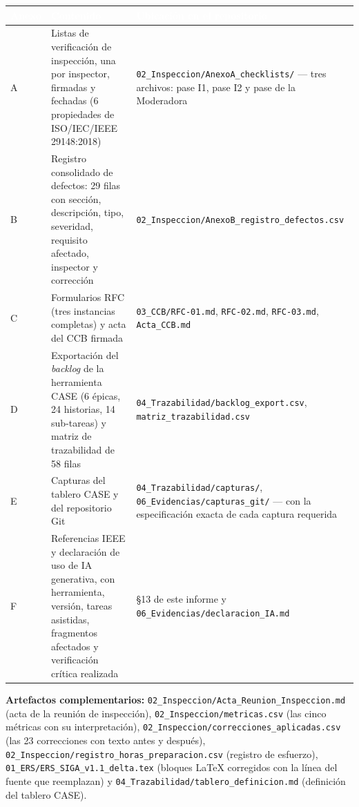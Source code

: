 \documentclass[11pt,letterpaper]{article}
\newcommand{\thead}[1]{\cellcolor{uteqverde}\textcolor{white}{\textbf{#1}}}
\begin{document}
\begin{center}
\small
\begin{tabular}{|p{1.3cm}|p{5.6cm}|p{7.6cm}|}
\hline
\thead{Anexo} & \thead{Contenido} & \thead{Ubicación en el repositorio} \\ \hline
A & Listas de verificación de inspección, una por inspector, firmadas y fechadas (6 propiedades de ISO/IEC/IEEE 29148:2018) & \texttt{02\_Inspeccion/AnexoA\_checklists/} --- tres archivos: pase I1, pase I2 y pase de la Moderadora \\ \hline
B & Registro consolidado de defectos: 29 filas con sección, descripción, tipo, severidad, requisito afectado, inspector y corrección & \texttt{02\_Inspeccion/AnexoB\_registro\_defectos.csv} \\ \hline
C & Formularios RFC (tres instancias completas) y acta del CCB firmada & \texttt{03\_CCB/RFC-01.md}, \texttt{RFC-02.md}, \texttt{RFC-03.md}, \texttt{Acta\_CCB.md} \\ \hline
D & Exportación del \emph{backlog} de la herramienta CASE (6 épicas, 24 historias, 14 sub-tareas) y matriz de trazabilidad de 58 filas & \texttt{04\_Trazabilidad/backlog\_export.csv}, \texttt{matriz\_trazabilidad.csv} \\ \hline
E & Capturas del tablero CASE y del repositorio Git & \texttt{04\_Trazabilidad/capturas/}, \texttt{06\_Evidencias/capturas\_git/} --- con la especificación exacta de cada captura requerida \\ \hline
F & Referencias IEEE y declaración de uso de IA generativa, con herramienta, versión, tareas asistidas, fragmentos afectados y verificación crítica realizada & \S13 de este informe y \texttt{06\_Evidencias/declaracion\_IA.md} \\ \hline
\end{tabular}
\end{center}

\vspace{6mm}
\textbf{Artefactos complementarios:} \texttt{02\_Inspeccion/Acta\_Reunion\_Inspeccion.md} (acta de la reunión de inspección), \texttt{02\_Inspeccion/metricas.csv} (las cinco métricas con su interpretación), \texttt{02\_Inspeccion/correcciones\_aplicadas.csv} (las 23 correcciones con texto antes y después), \texttt{02\_Inspeccion/registro\_horas\_preparacion.csv} (registro de esfuerzo), \texttt{01\_ERS/ERS\_SIGA\_v1.1\_delta.tex} (bloques \LaTeX{} corregidos con la línea del fuente que reemplazan) y \texttt{04\_Trazabilidad/tablero\_definicion.md} (definición del tablero CASE).
\end{document}
